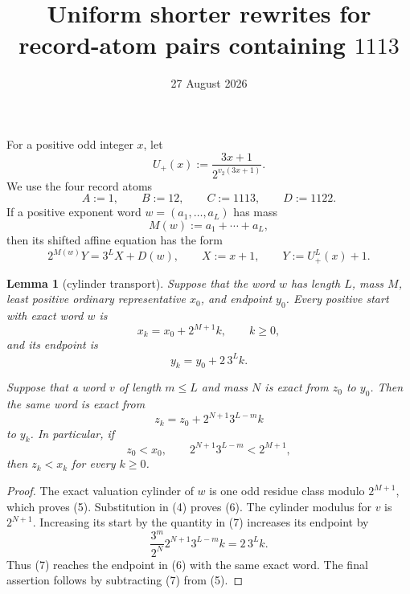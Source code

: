 \documentclass[11pt]{article}
\title{Uniform shorter rewrites for record-atom pairs containing $1113$}
\author{}
\date{27 August 2026}
\newtheorem{lemma}[theorem]{Lemma}
\newcommand{\Up}{U_+}
\begin{document}
\maketitle

For a positive odd integer $x$, let
\[
 \Up(x):=\frac{3x+1}{2^{v_2(3x+1)}}.
 \tag{1}
\]
We use the four record atoms
\[
 A:=1,
 \qquad B:=12,
 \qquad C:=1113,
 \qquad D:=1122.
 \tag{2}
\]
If a positive exponent word $w=(a_1,\ldots,a_L)$ has mass
\[
 M(w):=a_1+\cdots+a_L,
 \tag{3}
\]
then its shifted affine equation has the form
\[
 2^{M(w)}Y=3^LX+D(w),
 \qquad X:=x+1,
 \qquad Y:=\Up^L(x)+1.
 \tag{4}
\]

\begin{lemma}[cylinder transport]
Suppose that the word $w$ has length $L$, mass $M$, least positive
ordinary representative $x_0$, and endpoint $y_0$.  Every positive
start with exact word $w$ is
\[
 x_k=x_0+2^{M+1}k,
 \qquad k\geq0,
 \tag{5}
\]
and its endpoint is
\[
 y_k=y_0+2\,3^Lk.
 \tag{6}
\]

Suppose that a word $v$ of length $m\leq L$ and mass $N$ is exact from
$z_0$ to $y_0$.  Then the same word is exact from
\[
 z_k=z_0+2^{N+1}3^{L-m}k
 \tag{7}
\]
to $y_k$.  In particular, if
\[
 z_0<x_0,
 \qquad
 2^{N+1}3^{L-m}<2^{M+1},
 \tag{8}
\]
then $z_k<x_k$ for every $k\geq0$.
\end{lemma}

\begin{proof}
The exact valuation cylinder of $w$ is one odd residue class modulo
$2^{M+1}$, which proves (5).  Substitution in (4) proves (6).
The cylinder modulus for $v$ is $2^{N+1}$.  Increasing its start by the
quantity in (7) increases its endpoint by
\[
 \frac{3^m}{2^N}
 2^{N+1}3^{L-m}k
 =2\,3^Lk.
\]
Thus (7) reaches the endpoint in (6) with the same exact word.  The final
assertion follows by subtracting (7) from (5).
\end{proof}
\end{document}
